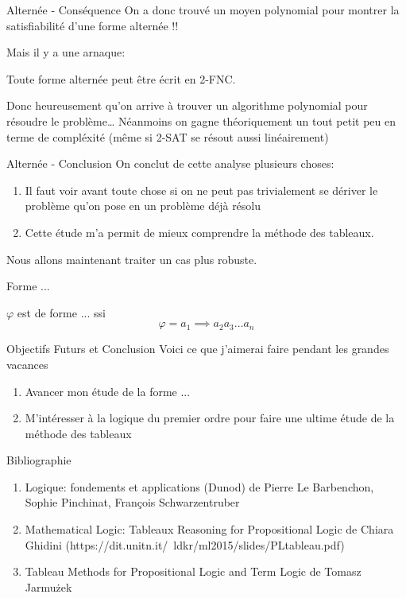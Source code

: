 \documentclass[]{beamer}
\begin{document}
\begin{frame}{Alternée - Conséquence}
    On a donc trouvé un moyen polynomial pour montrer la satisfiabilité d'une forme alternée !!

    Mais il y a une arnaque:
    \begin{theorem}
        Toute forme alternée peut être écrit en 2-FNC.
    \end{theorem}
    Donc heureusement qu'on arrive à trouver un algorithme polynomial pour résoudre le problème\dots
    Néanmoins on gagne théoriquement un tout petit peu en terme de compléxité (même si 2-SAT se résout aussi linéairement)
\end{frame}

\begin{frame}{Alternée - Conclusion}
    On conclut de cette analyse plusieurs choses:
    \begin{enumerate}
        \item Il faut voir avant toute chose si on ne peut pas trivialement se dériver le problème qu'on pose en un problème déjà résolu
        \item Cette étude m'a permit de mieux comprendre la méthode des tableaux.
    \end{enumerate}
    Nous allons maintenant traiter un cas plus robuste.
\end{frame}


\begin{frame}{Forme ...}
    \begin{definition}[Forme ...]
        $\varphi$ est de forme ... ssi
        $$\varphi = a_1 \implies a_2 a_3 \dots a_n$$
    \end{definition}
\end{frame}


\begin{frame}{Objectifs Futurs et Conclusion}
    Voici ce que j'aimerai faire pendant les grandes vacances
    \begin{enumerate}
        \item Avancer mon étude de la forme ...
        \item M'intéresser à la logique du premier ordre pour faire une ultime étude de la méthode des tableaux
    \end{enumerate}
\end{frame}

\begin{frame}{Bibliographie}
\begin{enumerate}
    \item Logique: fondements et applications (Dunod) de Pierre Le Barbenchon, Sophie Pinchinat, François Schwarzentruber
    \item Mathematical Logic: Tableaux Reasoning for Propositional Logic de Chiara Ghidini (https://dit.unitn.it/~ldkr/ml2015/slides/PLtableau.pdf)
    \item Tableau Methods  for Propositional Logic and Term Logic de Tomasz Jarmużek
\end{enumerate}
\end{frame}
\end{document}

